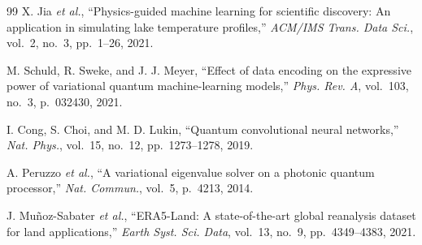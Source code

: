 \documentclass[conference]{IEEEtran}
\begin{document}
\begin{thebibliography}{99}
 X. Jia \textit{et al.}, ``Physics-guided machine learning for scientific discovery: An application in simulating lake temperature profiles,'' \textit{ACM/IMS Trans. Data Sci.}, vol.~2, no.~3, pp.~1--26, 2021.

 M. Schuld, R. Sweke, and J. J. Meyer, ``Effect of data encoding on the expressive power of variational quantum machine-learning models,'' \textit{Phys. Rev. A}, vol.~103, no.~3, p.~032430, 2021.

 I. Cong, S. Choi, and M. D. Lukin, ``Quantum convolutional neural networks,'' \textit{Nat. Phys.}, vol.~15, no.~12, pp.~1273--1278, 2019.

 A. Peruzzo \textit{et al.}, ``A variational eigenvalue solver on a photonic quantum processor,'' \textit{Nat. Commun.}, vol.~5, p.~4213, 2014.

 J. Mu\~{n}oz-Sabater \textit{et al.}, ``ERA5-Land: A state-of-the-art global reanalysis dataset for land applications,'' \textit{Earth Syst. Sci. Data}, vol.~13, no.~9, pp.~4349--4383, 2021.

\end{thebibliography}
\end{document}
